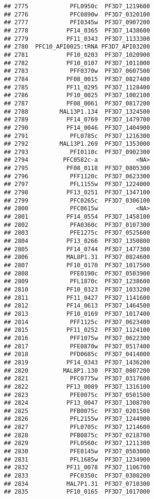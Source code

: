 \documentclass[12pt, a4paper]{article}\usepackage[]{graphicx}\usepackage[]{color}
\makeatletter
\newenvironment{kframe}{%
 \def\at@end@of@kframe{}%
 \ifinner\ifhmode%
  \def\at@end@of@kframe{\end{minipage}}%
  \begin{minipage}{\columnwidth}%
 \fi\fi%
 \def\FrameCommand##1{\hskip\@totalleftmargin \hskip-\fboxsep
 \colorbox{shadecolor}{##1}\hskip-\fboxsep
     \hskip-\linewidth \hskip-\@totalleftmargin \hskip\columnwidth}%
 \MakeFramed {\advance\hsize-\width
   \@totalleftmargin\z@ \linewidth\hsize
   \@setminipage}}%
 {\par\unskip\endMakeFramed%
 \at@end@of@kframe}
\newenvironment{knitrout}{}{} %
\makeatother
\begin{document}
\begin{knitrout}
\begin{kframe}
\begin{verbatim}
## 2775            PFL0950c  PF3D7_1219600
## 2776            PFC0890w  PF3D7_0320100
## 2777            PFI0345w  PF3D7_0907200
## 2778           PF14_0365  PF3D7_1438600
## 2779           PF11_0343  PF3D7_1133300
## 2780  PFC10_API0025:tRNA PF3D7_API03200
## 2781           PF10_0203  PF3D7_1020900
## 2782           PF10_0107  PF3D7_1011000
## 2783            PFF0370w  PF3D7_0607500
## 2784           PF08_0015  PF3D7_0827400
## 2785           PF11_0295  PF3D7_1128400
## 2786           PF10_0025  PF3D7_1002100
## 2787           PF08_0061  PF3D7_0817200
## 2788         MAL13P1.134  PF3D7_1324500
## 2789           PF14_0769  PF3D7_1479700
## 2790           PF14_0046  PF3D7_1404900
## 2791            PFL0785c  PF3D7_1216300
## 2792         MAL13P1.269  PF3D7_1353000
## 2793            PFI0110c  PF3D7_0902300
## 2794          PFC0582c-a           <NA>
## 2795           PF08_0118  PF3D7_0805300
## 2796            PFF1120c  PF3D7_0623300
## 2797            PFL1155w  PF3D7_1224000
## 2798           PF13_0251  PF3D7_1347100
## 2799            PFC0265c  PF3D7_0306100
## 2800            PFC0615w           <NA>
## 2801           PF14_0554  PF3D7_1458100
## 2802            PFA0360c  PF3D7_0107300
## 2803            PFE1275c  PF3D7_0525600
## 2804           PF13_0266  PF3D7_1350800
## 2805           PF14_0744  PF3D7_1477300
## 2806           MAL8P1.31  PF3D7_0824600
## 2807           PF10_0170  PF3D7_1017500
## 2808            PFE0190c  PF3D7_0503900
## 2809            PFL1870c  PF3D7_1238600
## 2810           PF10_0323  PF3D7_1033200
## 2811           PF11_0427  PF3D7_1141600
## 2812           PF14_0613  PF3D7_1464500
## 2813           PF10_0169  PF3D7_1017400
## 2814            PFF1125c  PF3D7_0623400
## 2815           PF11_0252  PF3D7_1124100
## 2816            PFF1075w  PF3D7_0622300
## 2817            PFE0870w  PF3D7_0517400
## 2818            PFD0685c  PF3D7_0414000
## 2819           PF14_0343  PF3D7_1436200
## 2820          MAL8P1.130  PF3D7_0807200
## 2821            PFC0775w  PF3D7_0317600
## 2822           PF13_0089  PF3D7_1316100
## 2823            PFE0075c  PF3D7_0501500
## 2824           PF13_0047  PF3D7_1308700
## 2825            PFB0075c  PF3D7_0201500
## 2826            PFL2155w  PF3D7_1244900
## 2827            PFL0705c  PF3D7_1214600
## 2828            PFB0875c  PF3D7_0218700
## 2829            PFL0560c  PF3D7_1211300
## 2830            PFE0145w  PF3D7_0503000
## 2831            PFL1685w  PF3D7_1234900
## 2832           PF11_0078  PF3D7_1106700
## 2833            PFC0350c  PF3D7_0308200
## 2834           MAL7P1.31  PF3D7_0710300
## 2835           PF10_0165  PF3D7_1017000

\end{verbatim}
\end{kframe}
\end{knitrout}
\end{document}
